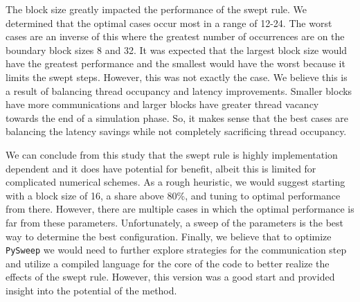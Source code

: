 \documentclass[preprints,article,accept,moreauthors,pdftex]{Definitions/mdpi}
\def\pysweep{\texttt{PySweep}}
\begin{document}
The block size greatly impacted the performance of the swept rule. We determined that the optimal cases occur most in a range of 12-24. The worst cases are an inverse of this where the greatest number of occurrences are on the boundary block sizes 8 and 32. It was expected that the largest block size would have the greatest performance and the smallest would have the worst because it limits the swept steps. However, this was not exactly the case. We believe this is a result of balancing thread occupancy and latency improvements. Smaller blocks have more communications and larger blocks have greater thread vacancy towards the end of a simulation phase. So, it makes sense that the best cases are balancing the latency savings while not completely sacrificing thread occupancy. 

We can conclude from this study that the swept rule is highly implementation dependent and it does have potential for benefit, albeit this is limited for complicated numerical schemes. As a rough heuristic, we would suggest starting with a block size of 16, a share above 80\%, and tuning to optimal performance from there. However, there are multiple cases in which the optimal performance is far from these parameters. Unfortunately, a sweep of the parameters is the best way to determine the best configuration. Finally, we believe that to optimize \pysweep{} we would need to further explore strategies for the communication step and utilize a compiled language for the core of the code to better realize the effects of the swept rule. However, this version was a good start and provided insight into the potential of the method. 

\vspace{6pt} 




\end{document}
